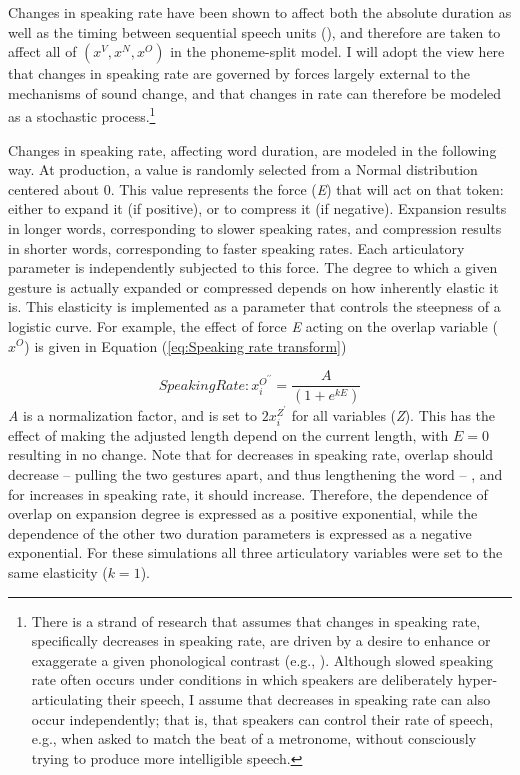 Changes in speaking rate have been shown to affect both the absolute
duration as well as the timing between sequential speech units (\citealt{stetson1928motor,Hardcastle1985}),
and therefore are taken to affect all of $(x^{V},x^{N},x^{O})$ in
the phoneme-split model. I will adopt the view here that changes in
speaking rate are governed by forces largely external to the mechanisms
of sound change, and that changes in rate can therefore be modeled
as a stochastic process.\footnote{There is a strand of research that assumes that changes in speaking
rate, specifically decreases in speaking rate, are driven by a desire
to enhance or exaggerate a given phonological contrast (e.g., \citealt{beckman2011rate}).
Although slowed speaking rate often occurs under conditions in which
speakers are deliberately hyper-articulating their speech, I assume
that decreases in speaking rate can also occur independently; that
is, that speakers can control their rate of speech, e.g., when asked
to match the beat of a metronome, without consciously trying to produce
more intelligible speech.}

Changes in speaking rate, affecting word duration, are modeled in
the following way. At production, a value is randomly selected from
a Normal distribution centered about 0. This value represents the
force (\emph{E}) that will act on that token: either to expand it
(if positive), or to compress it (if negative). Expansion results
in longer words, corresponding to slower speaking rates, and compression
results in shorter words, corresponding to faster speaking rates.
Each articulatory parameter is independently subjected to this force.
The degree to which a given gesture is actually expanded or compressed
depends on how inherently elastic it is. This elasticity is implemented
as a parameter that controls the steepness of a logistic curve. For
example, the effect of force \emph{E} acting on the overlap variable
($x^{O}$) is given in Equation (\ref{eq:Speaking rate transform}) 

\begin{equation}
\textit{SpeakingRate}:x_{i}^{O^{\prime\prime}}=\frac{A}{(1+e^{kE})}\label{eq:Speaking rate transform}
\end{equation}
\emph{A} is a normalization factor, and is set to $2x_{i}^{Z^{\prime}}$
for all variables (\emph{Z}). This has the effect of making the adjusted
length depend on the current length, with $E=0$ resulting in no change.
Note that for decreases in speaking rate, overlap should decrease
– pulling the two gestures apart, and thus lengthening the word –
, and for increases in speaking rate, it should increase. Therefore,
the dependence of overlap on expansion degree is expressed as a positive
exponential, while the dependence of the other two duration parameters
is expressed as a negative exponential. For these simulations all
three articulatory variables were set to the same elasticity ($k=1$). 

